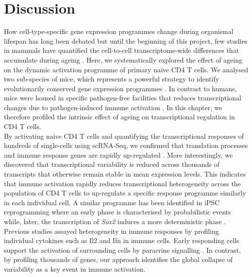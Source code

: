 
\section{Discussion}

How cell-type-specific gene expression programmes change during organismal lifespan has long been debated \citep{Bahar2006, Warren2007} but until the beginning of this project, few studies in mammals have quantified the cell-to-cell transcriptome-wide differences that accumulate during ageing \citep{Kowalczyk2015}. 
Here, we systematically explored the effect of ageing on the dynamic activation programme of primary naive CD4\plus{} T cells. We analysed two sub-species of mice, which represents a powerful strategy to identify evolutionarily conserved gene expression programmes \citep{Shay2013}. 
In contrast to humans, mice were housed in specific pathogen-free facilities that reduces transcriptional changes due to pathogen-induced immune activation \citep{Beura2016}. 
In this chapter, we therefore profiled the intrinsic effect of ageing on transcriptional regulation in CD4\plus{} T cells.\\

By activating naive CD4\plus{} T cells and quantifying the transcriptional responses of hundreds of single-cells using scRNA-Seq, we confirmed that translation processes and immune response genes are rapidly up-regulated \citep{Asmal2003, Neme2016, Turner2014, Glass2010, Gerondakis2010, Croft2009}. 
More interestingly, we discovered that transcriptional variability is reduced across thousands of transcripts that otherwise remain stable in mean expression levels. 
This indicates that immune activation rapidly reduces transcriptional heterogeneity across the population of CD4\plus{} T cells to up-regulate a specific response programme similarly in each individual cell. 
A similar programme has been identified in iPSC reprogramming where an early phase is characterised by probabilistic events while, later, the transcription of \textit{Sox2} induces a  more deterministic phase \citep{Buganim2012}. 
Previous studies assayed heterogeneity in immune responses by profiling individual cytokines such as Il2 and Ifn\textbeta{} in immune cells. 
Early responding cells support the activation of surrounding cells by paracrine signalling \citep{Fuhrmann2016, Shalek2014}. 
In contrast, by profiling thousands of genes, our approach identifies the global collapse of variability as a key event in immune activation.\\

